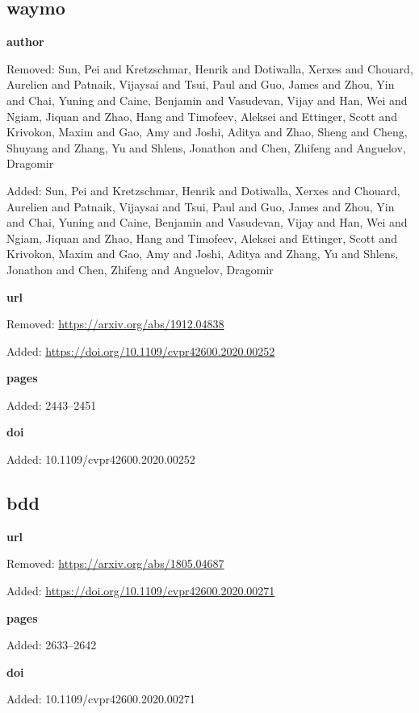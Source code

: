 \subsection*{waymo}
\noindent\textbf{author}\par
{\color{AuditRed}Removed: Sun, Pei and Kretzschmar, Henrik and Dotiwalla, Xerxes and Chouard, Aurelien and Patnaik, Vijaysai and Tsui, Paul and Guo, James and Zhou, Yin and Chai, Yuning and Caine, Benjamin and Vasudevan, Vijay and Han, Wei and Ngiam, Jiquan and Zhao, Hang and Timofeev, Aleksei and Ettinger, Scott and Krivokon, Maxim and Gao, Amy and Joshi, Aditya and Zhao, Sheng and Cheng, Shuyang and Zhang, Yu and Shlens, Jonathon and Chen, Zhifeng and Anguelov, Dragomir\par}
{\color{AuditGreen}Added: Sun, Pei and Kretzschmar, Henrik and Dotiwalla, Xerxes and Chouard, Aurelien and Patnaik, Vijaysai and Tsui, Paul and Guo, James and Zhou, Yin and Chai, Yuning and Caine, Benjamin and Vasudevan, Vijay and Han, Wei and Ngiam, Jiquan and Zhao, Hang and Timofeev, Aleksei and Ettinger, Scott and Krivokon, Maxim and Gao, Amy and Joshi, Aditya and Zhang, Yu and Shlens, Jonathon and Chen, Zhifeng and Anguelov, Dragomir\par}
\noindent\textbf{url}\par
{\color{AuditRed}Removed: \url{https://arxiv.org/abs/1912.04838}\par}
{\color{AuditGreen}Added: \url{https://doi.org/10.1109/cvpr42600.2020.00252}\par}
\noindent\textbf{pages}\par
{\color{AuditGreen}Added: 2443–2451\par}
\noindent\textbf{doi}\par
{\color{AuditGreen}Added: 10.1109/cvpr42600.2020.00252\par}
\medskip

\subsection*{bdd}
\noindent\textbf{url}\par
{\color{AuditRed}Removed: \url{https://arxiv.org/abs/1805.04687}\par}
{\color{AuditGreen}Added: \url{https://doi.org/10.1109/cvpr42600.2020.00271}\par}
\noindent\textbf{pages}\par
{\color{AuditGreen}Added: 2633–2642\par}
\noindent\textbf{doi}\par
{\color{AuditGreen}Added: 10.1109/cvpr42600.2020.00271\par}
\medskip

